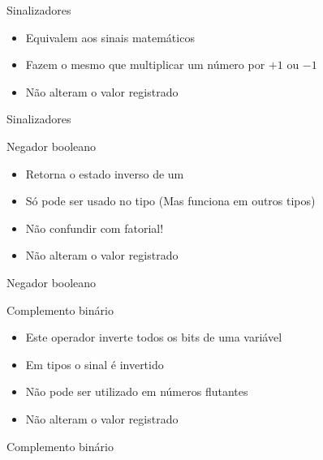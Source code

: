 \documentclass[11pt]{beamer}
\begin{document}
	\begin{frame}{Sinalizadores}
		\begin{itemize}
			\presentationPause\item Equivalem aos sinais matemáticos
			\presentationPause\item Fazem o mesmo que multiplicar um número por $+1$ ou $-1$
			\presentationPause\item Não alteram o valor registrado
		\end{itemize}
		\presentationPause
	\end{frame}\begin{frame}{Sinalizadores}
		
	\end{frame}

	\begin{frame}{Negador booleano}
		\begin{itemize}
			\presentationPause\item Retorna o estado inverso de um 
			\presentationPause\item Só pode ser usado no tipo  \presentationPause(Mas funciona em outros tipos)
			\presentationPause\item Não confundir com fatorial!
			\presentationPause\item Não alteram o valor registrado
		\end{itemize}
		\presentationPause
	\end{frame}\begin{frame}{Negador booleano}
		
	\end{frame}

	\begin{frame}{Complemento binário}
			\begin{itemize}
				\presentationPause\item Este operador inverte todos os bits de uma variável
				\presentationPause\item Em tipos  o sinal é invertido
				\presentationPause\item Não pode ser utilizado em números flutantes
				\presentationPause\item Não alteram o valor registrado
			\end{itemize}
			\presentationPause
	\end{frame}\begin{frame}{Complemento binário}
		
	\end{frame}
\end{document}
